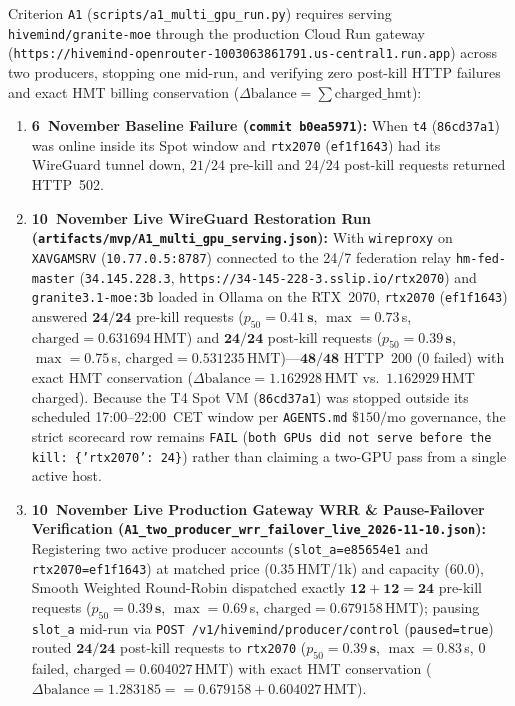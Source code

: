 \documentclass[11pt,a4paper]{article}
\begin{document}
Criterion \texttt{A1} (\texttt{scripts/a1\_multi\_gpu\_run.py}) requires serving \texttt{hivemind/granite-moe} through the production Cloud Run gateway (\texttt{https://hivemind-openrouter-1003063861791.us-central1.run.app}) across two producers, stopping one mid-run, and verifying zero post-kill HTTP failures and exact HMT billing conservation ($\Delta\text{balance} = \sum\text{charged\_hmt}$):
\begin{enumerate}[leftmargin=1.8em]
    \item \textbf{6~November Baseline Failure (\texttt{commit b0ea5971}):} When \texttt{t4} (\texttt{86cd37a1}) was online inside its Spot window and \texttt{rtx2070} (\texttt{ef1f1643}) had its WireGuard tunnel down, $21/24$ pre-kill and $24/24$ post-kill requests returned HTTP~502.
    \item \textbf{10~November Live WireGuard Restoration Run (\texttt{artifacts/mvp/A1\_multi\_gpu\_serving.json}):} With \texttt{wireproxy} on \texttt{XAVGAMSRV} (\texttt{10.77.0.5:8787}) connected to the 24/7 federation relay \texttt{hm-fed-master} (\texttt{34.145.228.3}, \texttt{https://34-145-228-3.sslip.io/rtx2070}) and \texttt{granite3.1-moe:3b} loaded in Ollama on the RTX~2070, \texttt{rtx2070} (\texttt{ef1f1643}) answered $\mathbf{24/24}$ pre-kill requests ($p_{50} = \mathbf{0.41\,\text{s}}$, $\max = 0.73$\,s, $\text{charged} = 0.631694$\,HMT) and $\mathbf{24/24}$ post-kill requests ($p_{50} = \mathbf{0.39\,\text{s}}$, $\max = 0.75$\,s, $\text{charged} = 0.531235$\,HMT)---$\mathbf{48/48}$ HTTP~200 ($0$ failed) with exact HMT conservation ($\Delta\text{balance} = \mathbf{1.162928}$\,HMT vs.\ $1.162929$\,HMT charged). Because the T4 Spot VM (\texttt{86cd37a1}) was stopped outside its scheduled 17:00--22:00~CET window per \texttt{AGENTS.md} $\$150/\text{mo}$ governance, the strict scorecard row remains \texttt{FAIL} (\texttt{both GPUs did not serve before the kill: \{'rtx2070': 24\}}) rather than claiming a two-GPU pass from a single active host.
    \item \textbf{10~November Live Production Gateway WRR \& Pause-Failover Verification (\texttt{A1\_two\_producer\_wrr\_failover\_live\_2026-11-10.json}):} Registering two active producer accounts (\texttt{slot\_a=e85654e1} and \texttt{rtx2070=ef1f1643}) at matched price ($0.35$\,HMT/1k) and capacity ($60.0$), Smooth Weighted Round-Robin dispatched exactly $\mathbf{12 + 12 = 24}$ pre-kill requests ($p_{50} = \mathbf{0.39\,\text{s}}$, $\max = 0.69$\,s, $\text{charged} = 0.679158$\,HMT); pausing \texttt{slot\_a} mid-run via \texttt{POST /v1/hivemind/producer/control} (\texttt{paused=true}) routed $\mathbf{24/24}$ post-kill requests to \texttt{rtx2070} ($p_{50} = \mathbf{0.39\,\text{s}}$, $\max = 0.83$\,s, $0$ failed, $\text{charged} = 0.604027$\,HMT) with exact HMT conservation ($\Delta\text{balance} = \mathbf{1.283185 == 0.679158 + 0.604027}$\,HMT).
\end{enumerate}
\end{document}
